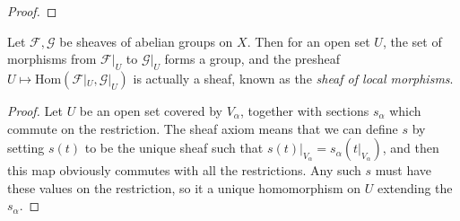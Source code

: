 \begin{proof}

\end{proof}

\begin{theorem}
    Let $\mathcal{F}, \mathcal{G}$ be sheaves of abelian groups on $X$. Then for an open set $U$, the set of morphisms from $\mathcal{F}|_U$ to $\mathcal{G}|_U$ forms a group, and the presheaf $U \mapsto \text{Hom}(\mathcal{F}|_U, \mathcal{G}|_U)$ is actually a sheaf, known as the {\it sheaf of local morphisms}.
\end{theorem}
\begin{proof}
    Let $U$ be an open set covered by $V_\alpha$, together with sections $s_\alpha$ which commute on the restriction. The sheaf axiom means that we can define $s$ by setting $s(t)$ to be the unique sheaf such that $s(t)|_{V_\alpha} = s_\alpha(t|_{V_\alpha})$, and then this map obviously commutes with all the restrictions. Any such $s$ must have these values on the restriction, so it a unique homomorphism on $U$ extending the $s_\alpha$.
\end{proof}

